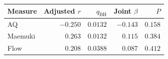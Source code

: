 \begin{center}
{\small
\setlength{\tabcolsep}{7pt}
\renewcommand{\arraystretch}{1.12}
\begin{tabular}{lrrrr}
\toprule
Measure & Adjusted \(r\) & \(q_{\mathrm{BH}}\) & Joint \(\beta\) & \(P\) \\
\midrule
AQ & \(-0.250\) & \(0.0132\) & \(-0.143\) & \(0.158\) \\
Maemuki & \(0.263\) & \(0.0132\) & \(0.115\) & \(0.384\) \\
Flow & \(0.208\) & \(0.0388\) & \(0.087\) & \(0.412\) \\
\bottomrule
\end{tabular}
}
\end{center}
